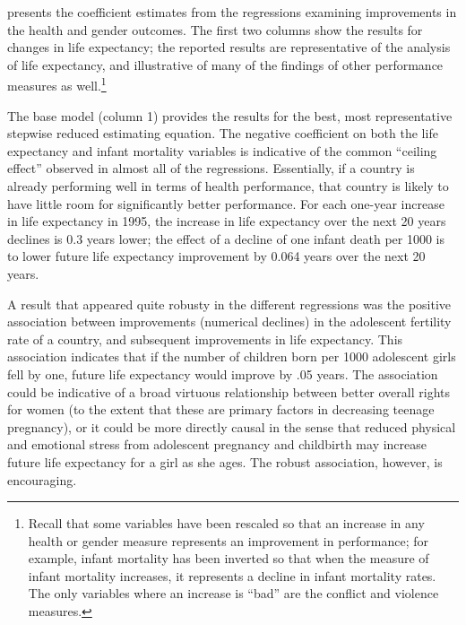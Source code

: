 \documentclass[12pt]{article}
\begin{document}


 presents the coefficient estimates from the regressions examining improvements in the health and gender outcomes. The first two columns show the results for changes in life expectancy; the reported results are representative of the analysis of life expectancy, and illustrative of many of the findings of other performance measures as well.\footnote{Recall that some variables have been rescaled so that an increase in any health or gender measure represents an improvement in performance; for example, infant mortality has been inverted so that when the measure of infant mortality increases, it represents a decline in infant mortality rates. The only variables where an increase is \enquote{bad} are the conflict and violence measures.}

The base model (column 1) provides the results for the best, most representative stepwise reduced estimating equation. The negative coefficient on both the life expectancy and infant mortality variables is indicative of the common \enquote{ceiling effect} observed in almost all of the regressions. Essentially, if a country is already performing well in terms of health performance, that country is likely to have little room for significantly better performance. For each one-year increase in life expectancy in 1995, the increase in life expectancy over the next 20 years declines is 0.3 years lower; the effect of a decline of one infant death per 1000 is to lower future life expectancy improvement by 0.064 years over the next 20 years.

A result that appeared quite robusty in the different regressions was the positive association between improvements (numerical declines) in the adolescent fertility rate of a country, and subsequent improvements in life expectancy. This association indicates that if the number of children born per 1000 adolescent girls fell by one, future life expectancy would improve by .05 years. The association could be indicative of a broad virtuous relationship between better overall rights for women (to the extent that these are primary factors in decreasing teenage pregnancy), or it could be more directly causal in the sense that reduced physical and emotional stress from adolescent pregnancy and childbirth may increase future life expectancy for a girl as she ages. The robust association, however, is encouraging.
\end{document}
